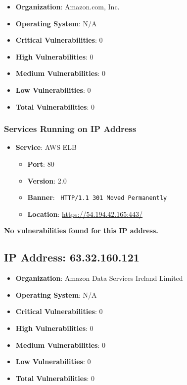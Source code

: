 \documentclass{article}
\begin{document}
\begin{itemize}
    \item \textbf{Organization}: Amazon.com, Inc.
    \item \textbf{Operating System}:  N/A 
    \item \textbf{Critical Vulnerabilities}: 0
    \item \textbf{High Vulnerabilities}: 0
    \item \textbf{Medium Vulnerabilities}: 0
    \item \textbf{Low Vulnerabilities}: 0
    \item \textbf{Total Vulnerabilities}: 0
\end{itemize}

\subsubsection*{Services Running on IP Address}

\begin{itemize}
    
        \item \textbf{Service}: AWS ELB
        \begin{itemize}
            \item \textbf{Port}: 80
            \item \textbf{Version}:  2.0 
            \item \textbf{Banner}: \texttt{ HTTP/1.1 301 Moved Permanently
 }
            \item \textbf{Location}: \href{ https://54.194.42.165:443/ }{ https://54.194.42.165:443/ }
        \end{itemize}
    
\end{itemize}


\textbf{No vulnerabilities found for this IP address.}


\clearpage



\subsection*{IP Address: 63.32.160.121}

\begin{itemize}
    \item \textbf{Organization}: Amazon Data Services Ireland Limited
    \item \textbf{Operating System}:  N/A 
    \item \textbf{Critical Vulnerabilities}: 0
    \item \textbf{High Vulnerabilities}: 0
    \item \textbf{Medium Vulnerabilities}: 0
    \item \textbf{Low Vulnerabilities}: 0
    \item \textbf{Total Vulnerabilities}: 0
\end{itemize}
\end{document}
